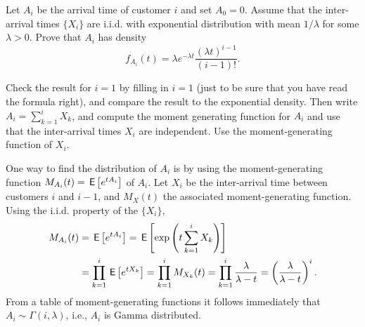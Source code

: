   \begin{extra}\label{ex:54}
    Let $A_i$ be the arrival time of customer $i$ and set $A_0=0$.
    Assume that the inter-arrival times $\{X_i\}$ are i.i.d.
    with exponential distribution with mean $1/\lambda$ for some $\lambda>0$.
    Prove that $A_i$ has density
\begin{equation*}
f_{A_i}(t) = \lambda e^{-\lambda t} \frac{(\lambda t)^{i-1}}{(i-1)!}.
\end{equation*}
\begin{hint}
 Check the result for $i=1$ by filling in $i=1$ (just to be
     sure that you have read the formula right), and compare the result
     to the exponential density. Then write $A_i =\sum_{k=1}^i X_k$, and compute the moment
     generating function for $A_i$ and use that the inter-arrival times
     $X_i$ are independent. Use the moment-generating function  of $X_i$.
\end{hint}
\begin{solution}
  One way to find the distribution of $A_i$ is by using the moment-generating function $M_{A_i}(t) = \,\mathsf{E}\left[e^{t A_i}\right]$ of $A_i$.
  Let $X_i$ be the inter-arrival time between customers $i$ and $i-1$, and $M_X(t)$ the associated moment-generating function.
  Using the i.i.d.
  property of the $\{X_i\}$,
\begin{align*}
  M_{A_i}(t) &= \,\mathsf{E}\left[e^{t A_i}\right] = \,\mathsf{E}\left[\exp\left(t\sum_{k=1}^{i} X_k\right)\right] \\
& = \prod_{k=1}^{i} \,\mathsf{E}\left[e^{tX_k}\right] = 
\prod_{k=1}^{i} M_{X_k}(t) = 
\prod_{k=1}^{i} \frac{\lambda}{\lambda -t }
 = \left(\frac{\lambda}{\lambda -t }\right)^i.
\end{align*}
From a table of moment-generating functions it follows immediately that
$A_i \sim \Gamma(i,\lambda)$, i.e., $A_i$ is Gamma distributed.
\end{solution}
\end{extra}

